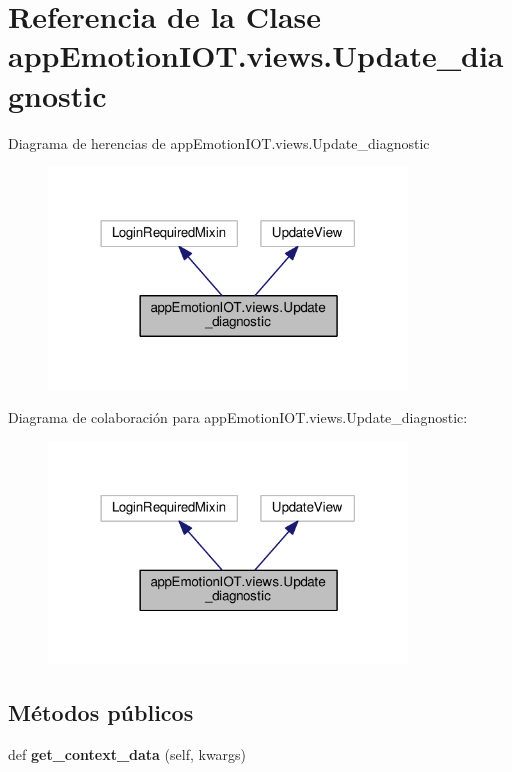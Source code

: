 \hypertarget{classappEmotionIOT_1_1views_1_1Update__diagnostic}{}\section{Referencia de la Clase app\+Emotion\+I\+O\+T.\+views.\+Update\+\_\+diagnostic}
\label{classappEmotionIOT_1_1views_1_1Update__diagnostic}


Diagrama de herencias de app\+Emotion\+I\+O\+T.\+views.\+Update\+\_\+diagnostic
\nopagebreak
\begin{figure}[H]
\begin{center}
\leavevmode
\includegraphics[width=270pt]{classappEmotionIOT_1_1views_1_1Update__diagnostic__inherit__graph}
\end{center}
\end{figure}


Diagrama de colaboración para app\+Emotion\+I\+O\+T.\+views.\+Update\+\_\+diagnostic\+:
\nopagebreak
\begin{figure}[H]
\begin{center}
\leavevmode
\includegraphics[width=270pt]{classappEmotionIOT_1_1views_1_1Update__diagnostic__coll__graph}
\end{center}
\end{figure}
\subsection*{Métodos públicos}
\begin{DoxyCompactItemize}
\item 
def {\bfseries get\+\_\+context\+\_\+data} (self, kwargs)\hypertarget{classappEmotionIOT_1_1views_1_1Update__diagnostic_acacaa7f3171462e5e0c317f98ad6035d}{}\label{classappEmotionIOT_1_1views_1_1Update__diagnostic_acacaa7f3171462e5e0c317f98ad6035d}

\end{DoxyCompactItemize}
